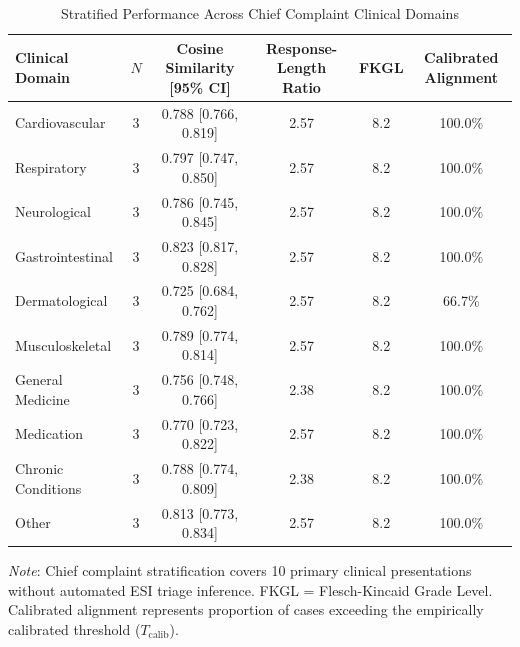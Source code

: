 \begin{table}[htbp]
\centering
\small
\caption{Stratified Performance Across Chief Complaint Clinical Domains}
\label{tab:domain_slices}
\begin{tabular}{lccccc}
\toprule
\textbf{Clinical Domain} & \textbf{$N$} & \textbf{Cosine Similarity [95\% CI]} & \textbf{Response-Length Ratio} & \textbf{FKGL} & \textbf{Calibrated Alignment} \\
\midrule
Cardiovascular & 3 & 0.788 [0.766, 0.819] & 2.57 & 8.2 & 100.0\% \\
Respiratory & 3 & 0.797 [0.747, 0.850] & 2.57 & 8.2 & 100.0\% \\
Neurological & 3 & 0.786 [0.745, 0.845] & 2.57 & 8.2 & 100.0\% \\
Gastrointestinal & 3 & 0.823 [0.817, 0.828] & 2.57 & 8.2 & 100.0\% \\
Dermatological & 3 & 0.725 [0.684, 0.762] & 2.57 & 8.2 & 66.7\% \\
Musculoskeletal & 3 & 0.789 [0.774, 0.814] & 2.57 & 8.2 & 100.0\% \\
General Medicine & 3 & 0.756 [0.748, 0.766] & 2.38 & 8.2 & 100.0\% \\
Medication & 3 & 0.770 [0.723, 0.822] & 2.57 & 8.2 & 100.0\% \\
Chronic Conditions & 3 & 0.788 [0.774, 0.809] & 2.38 & 8.2 & 100.0\% \\
Other & 3 & 0.813 [0.773, 0.834] & 2.57 & 8.2 & 100.0\% \\
\bottomrule
\end{tabular}
\begin{tablenotes}
\footnotesize
\item \textit{Note}: Chief complaint stratification covers 10 primary clinical presentations without automated ESI triage inference. FKGL = Flesch-Kincaid Grade Level. Calibrated alignment represents proportion of cases exceeding the empirically calibrated threshold ($T_{\text{calib}}$).
\end{tablenotes}
\end{table}
